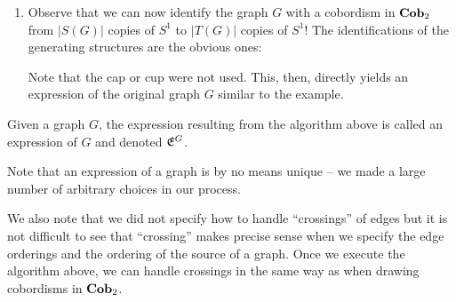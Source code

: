 \documentclass[./Thick_TQFTs_and_Quantum_Information.tex]{subfiles}
\begin{document}
\begin{enumerate}
\item Observe that we can now identify the graph $G$ with a cobordism in
$\textbf{Cob}_2$ from $|S(G)|$ copies of $S^1$ to $|T(G)|$ copies of $S^1$! The
identifications of the generating structures are the obvious ones:
\begin{figure}[H]
\begin{center}
\qquad
{}
\qquad
{}
\end{center}
\end{figure}
Note that the cap or cup were not used. This, then, directly yields an
expression of the original graph $G$ similar to the example.

\end{enumerate}

\begin{defn}
Given a graph $G$, the expression resulting from the algorithm above is called
an expression of $G$ and denoted $\mathfrak{E}^{G}$.
\end{defn}

\begin{rmk}
Note that an expression of a graph is by no means unique -- we made a large
number of arbitrary choices in our process.
\end{rmk}

\begin{rmk} We also note that we did not specify how to handle ``crossings'' of
edges but it is not difficult to see that ``crossing'' makes precise sense when
we specify the edge orderings and the ordering of the source of a graph. Once we
execute the algorithm above, we can handle crossings in the same way as when
drawing cobordisms in $\textbf{Cob}_2$.
\end{rmk}
\end{document}
